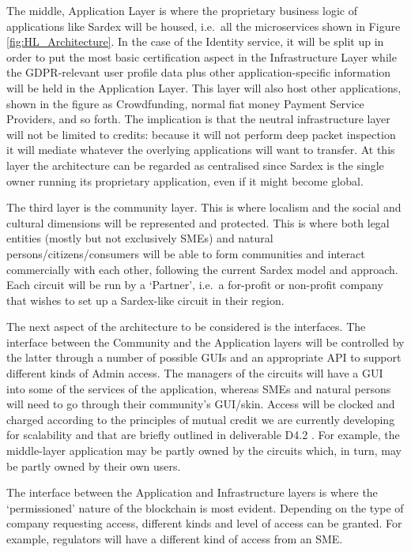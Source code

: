 The middle, Application Layer is where the proprietary business logic of applications like Sardex will be housed, i.e.\ all the microservices shown in Figure \ref{fig:HL_Architecture}. In the case of the Identity service, it will be split up in order to put the most basic certification aspect in the Infrastructure Layer while the GDPR-relevant user profile data plus other application-specific information will be held in the Application Layer. This layer will also host other applications, shown in the figure as Crowdfunding, normal fiat money Payment Service Providers, and so forth. The implication is that the neutral infrastructure layer will not be limited to credits: because it will not perform deep packet inspection it will mediate whatever the overlying applications will want to transfer. At this layer the architecture can be regarded as centralised since Sardex is the single owner running its proprietary application, even if it might become global.

The third layer is the community layer. This is where localism and the social and cultural dimensions will be represented and protected. This is where both legal entities (mostly but not exclusively SMEs) and natural persons/citizens/consumers will be able to form communities and interact commercially with each other, following the current Sardex model and approach. Each circuit will be run by a `Partner', i.e.\ a for-profit or non-profit company that wishes to set up a Sardex-like circuit in their region.

The next aspect of the architecture to be considered is the interfaces. The interface between the Community and the Application layers will be controlled by the latter through a number of possible GUIs and an appropriate API to support different kinds of Admin access. The managers of the circuits will have a GUI into some of the services of the application, whereas SMEs and natural persons will need to go through their community's GUI/skin. Access will be clocked and charged according to the principles of mutual credit we are currently developing for scalability and that are briefly outlined in deliverable D4.2 \cite{INTERLACE_D42}. For example, the middle-layer application may be partly owned by the circuits which, in turn, may be partly owned by their own users.

The interface between the Application and Infrastructure layers is where the `permissioned' nature of the blockchain is most evident. Depending on the type of company requesting access, different kinds and level of access can be granted. For example, regulators will have a different kind of access from an SME.

